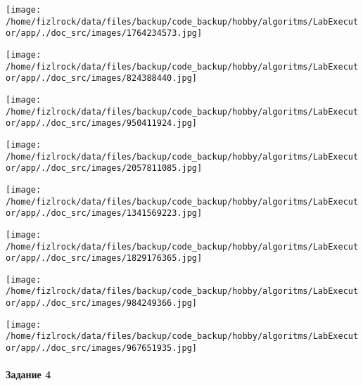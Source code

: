 \documentclass[a4paper, 12pt]{article}
\begin{document}
\texttt{[image: /home/fizlrock/data/files/backup/code\_backup/hobby/algoritms/LabExecutor/app/./doc\_src/images/1764234573.jpg]}

\texttt{[image: /home/fizlrock/data/files/backup/code\_backup/hobby/algoritms/LabExecutor/app/./doc\_src/images/824388440.jpg]}

\texttt{[image: /home/fizlrock/data/files/backup/code\_backup/hobby/algoritms/LabExecutor/app/./doc\_src/images/950411924.jpg]}

\texttt{[image: /home/fizlrock/data/files/backup/code\_backup/hobby/algoritms/LabExecutor/app/./doc\_src/images/2057811085.jpg]}

\texttt{[image: /home/fizlrock/data/files/backup/code\_backup/hobby/algoritms/LabExecutor/app/./doc\_src/images/1341569223.jpg]}

\texttt{[image: /home/fizlrock/data/files/backup/code\_backup/hobby/algoritms/LabExecutor/app/./doc\_src/images/1829176365.jpg]}

\texttt{[image: /home/fizlrock/data/files/backup/code\_backup/hobby/algoritms/LabExecutor/app/./doc\_src/images/984249366.jpg]}

\texttt{[image: /home/fizlrock/data/files/backup/code\_backup/hobby/algoritms/LabExecutor/app/./doc\_src/images/967651935.jpg]}
\pagebreak
\paragraph{Задание 4}
\end{document}
